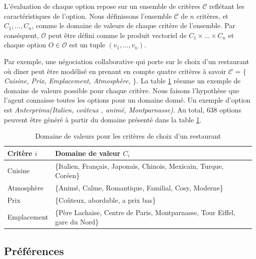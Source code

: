 		L'évaluation de chaque option repose sur un ensemble de critères $\mathcal{C}$ reflétant les caractéristiques de l'option. Nous définissons l'ensemble $\mathcal{C}$ de $n$ critères, et $C_1,\ldots,C_n$, comme le domaine de valeurs de chaque critère de l'ensemble. 
		Par conséquent, $\mathcal{O}$ peut être défini comme le produit vectoriel de  $C_1\times\ldots\times C_n$ et chaque option $O \in \mathcal{O}$ est un tuple $(v_1,\ldots,v_n)$. 
		
		Par exemple, une négociation collaborative qui porte sur le choix d'un restaurant où dîner peut être modélisé en prenant en compte quatre critères à savoir $\mathcal{C}$ = \emph{$\{$Cuisine, Prix, Emplacement, Atmosphère, $\}$}. La table \ref{tab:domain} résume un exemple de domaine de valeurs possible pour chaque critère. Nous faisons l'hypothèse que l'agent connaisse toutes les options pour un domaine donné. Un exemple d'option est  \emph{Anterprima(Italien, coûteux , animé, Montparnasse)}. Au total, $638$ options peuvent être généré à partir du domaine présenté dans la table \ref{tab:domain}. 
		\begin{table}[h]
			\centering
			\begin{tabular}{|p{2.25cm}|p{10cm}|}
				\hline
				Critère $i $ & Domaine de valeur $C_i$ \\
				\hline
				Cuisine & \{Italien, Français, Japonais, Chinois, Mexicain, Turque, Coréen\} \\
				\hline
				Atmosphère & \{Animé, Calme, Romantique, Familial, Cosy, Moderne\} \\
				\hline
				Prix & \{Coûteux, abordable, a prix bas\} \\
				\hline
				Emplacement & \{Père Lachaise, Centre de Paris, Montparnasse, Tour Eiffel, gare du Nord\} \\
				\hline
				
			\end{tabular}
			\caption{Domaine de valeurs pour les critères de choix d'un restaurant} 
			\label{tab:domain}
		\end{table}
		
		
		\subsection{Préférences}
		
